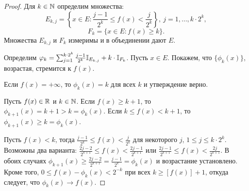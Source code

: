 \begin{proof}
    Для $k \in \mathbb{N}$ определим множества:
    \[E_{k, j} = \left\{x \in E: \frac{j - 1}{2^{k}} \leq f(x) < \frac{j}{2^{k}}\right\}, \ j = 1, \ldots, k\cdot2^{k},\]
    \[F_{k} = \{x \in E: f(x) \geq k\}.\]
    Множества $E_{k, j}$ и $F_{k}$ измеримы и в объединении дают $E$.

    Определим $\varphi_{k} = \sum_{j = 1}^{k\cdot2^{k}}\frac{j - 1}{2^{k}}\mathbb{I}_{E_{k, j}} + k\cdot\mathbb{I}_{F_{k}}$. Пусть $x \in E$. Покажем, что $\{\phi_{k}(x)\}$, возрастая, стремится к $f(x)$.

    Если $f(x) = +\infty$, то $\phi_{k}(x) = k$ для всех $k$ и утверждение верно.

    Пусть $f(x) \in \mathbb{R}$ и $k \in \mathbb{N}$. Если $f(x) \geq k + 1$, то $\phi_{k + 1}(x) = k + 1 > k = \phi_{k}(x)$. Если $k \leq f(x) < k + 1$, то $\phi_{k + 1}(x) \geq k = \phi_{k}(x)$.

    Пусть $f(x) < k$, тогда $\frac{j - 1}{2^{k}} \leq f(x) < \frac{j}{2^{k}}$ для некоторого $j$, $1 \leq j \leq k\cdot2^{k}$. Возможны два варианта: $\frac{2j - 2}{2^{k + 1}} \leq f(x) < \frac{2j - 1}{2^{k + 1}}$ или $\frac{2j - 1}{2^{k + 1}} \leq f(x) < \frac{2j}{2^{k + 1}}$. В обоих случаях $\phi_{k + 1}(x) \geq \frac{2j - 2}{2^{k+1}} = \frac{j - 1}{2^{k}} = \phi_{k}(x)$ и возрастание установлено. Кроме того, $0 \leq f(x) - \phi_{k}(x) < 2^{-k}$ при всех $k \geq [f(x)] + 1$, откуда следует, что $\phi_{k}(x) \to f(x)$. 
\end{proof}